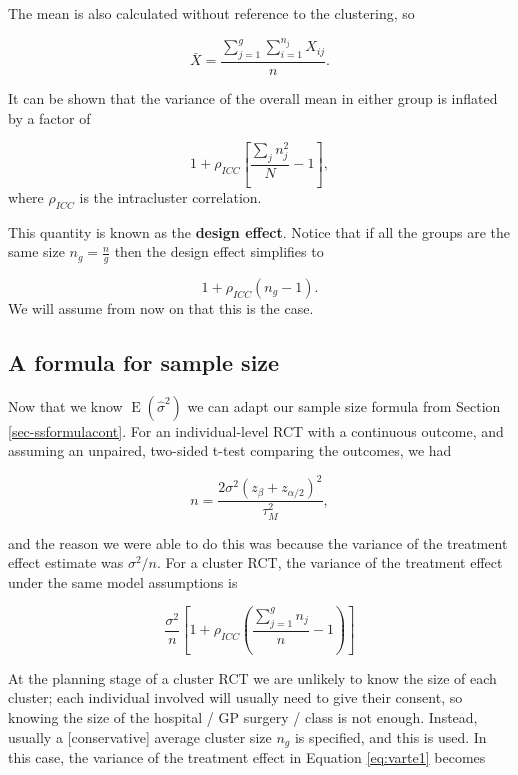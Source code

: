 \documentclass[
  openany]{book}
\theoremstyle{definition}
\theoremstyle{definition}
\theoremstyle{definition}
\theoremstyle{definition}
\theoremstyle{remark}
\begin{document}
The mean is also calculated without reference to the clustering, so

\[\bar{X} =  \frac{\sum\limits_{j=1}^g\sum\limits_{i=1}^{n_j}X_{ij}}{n}.\]

It can be shown that the variance of the overall mean in either group is inflated by a factor of

\[1 + \rho_{ICC}\left[ \frac{\sum\limits_j n_j^2}{N} - 1 \right], \]
where \(\rho_{ICC}\) is the intracluster correlation.

This quantity is known as the \textbf{design effect}. Notice that if all the groups are the same size \(n_g = \frac{n}{g}\) then the design effect simplifies to

\[1 + \rho_{ICC}\left(n_g - 1\right).\]
We will assume from now on that this is the case.

\subsection{A formula for sample size}\label{ss-crt}

Now that we know \(\operatorname{E}\left(\hat{\sigma}^2\right)\) we can adapt our sample size formula from Section \ref{sec-ssformulacont}. For an individual-level RCT with a continuous outcome, and assuming an unpaired, two-sided t-test comparing the outcomes, we had

\begin{equation}
n = \frac{2\sigma^2\left(z_{\beta} + z_{\alpha/2}\right)^2}{\tau^2_M}, 
\label{eq:ss1}
\end{equation}

and the reason we were able to do this was because the variance of the treatment effect estimate was \(\sigma^2/n\).
For a cluster RCT, the variance of the treatment effect under the same model assumptions is

\begin{equation}
\frac{\sigma^2}{n} \left[1 + \rho_{ICC}\left(\frac{\sum\limits_{j=1}^g n_j}{n}-1\right)\right]
\label{eq:varte1}
\end{equation}

At the planning stage of a cluster RCT we are unlikely to know the size of each cluster; each individual involved will usually need to give their consent, so knowing the size of the hospital / GP surgery / class is not enough. Instead, usually a {[}conservative{]} average cluster size \(n_g\) is specified, and this is used. In this case, the variance of the treatment effect in Equation \eqref{eq:varte1} becomes
\end{document}
